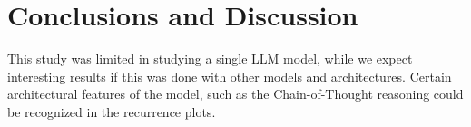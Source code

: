 \documentclass[a4paper,12pt]{article}
\begin{document}
\section{Conclusions and Discussion}
\label{sec:conclusions}



This study was limited in studying a single LLM model, while we expect interesting results if this was done with other models and architectures. Certain architectural features of the model, such as the Chain-of-Thought reasoning could be recognized in the recurrence plots.




\end{document}
